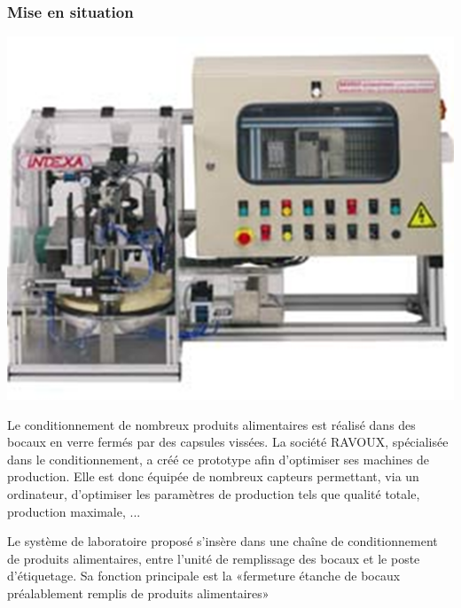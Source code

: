 \subsubsection{Mise en situation}

\begin{minipage}[c]{.4\linewidth}
\begin{center}
 \includegraphics[width=\textwidth]{png/capsuleuse}
\end{center}

\end{minipage} \hfill
\begin{minipage}[c]{.55\linewidth}
Le conditionnement de nombreux produits alimentaires est réalisé dans des bocaux en verre fermés par des capsules vissées. La société RAVOUX, spécialisée dans le conditionnement, a créé ce prototype afin d'optimiser ses machines de production. Elle est donc équipée de nombreux capteurs permettant, via un ordinateur, d'optimiser les paramètres de production tels que qualité totale, production maximale, ...

Le système de laboratoire proposé s'insère dans une chaîne de conditionnement de produits alimentaires, entre l'unité de remplissage des bocaux et le poste d'étiquetage. Sa fonction principale est la «fermeture étanche de bocaux préalablement remplis de produits alimentaires»
\end{minipage}

